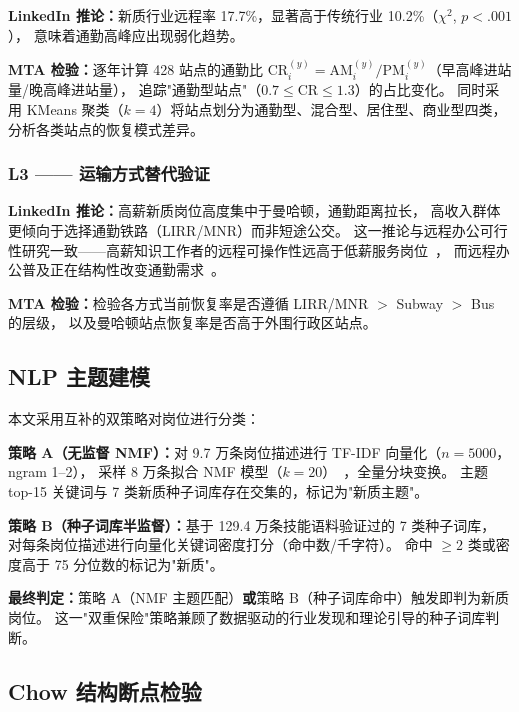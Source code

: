 \documentclass[runningheads]{llncs}
\begin{document}
\textbf{LinkedIn 推论：}新质行业远程率 17.7\%，显著高于传统行业 10.2\%（$\chi^2$, $p<.001$），
意味着通勤高峰应出现弱化趋势。

\textbf{MTA 检验：}逐年计算 428 站点的通勤比
$\text{CR}_i^{(y)} = \text{AM}_i^{(y)} / \text{PM}_i^{(y)}$（早高峰进站量/晚高峰进站量），
追踪"通勤型站点"（$0.7 \leq \text{CR} \leq 1.3$）的占比变化。
同时采用 KMeans 聚类（$k=4$）将站点划分为通勤型、混合型、居住型、商业型四类，
分析各类站点的恢复模式差异。

\subsubsection*{L3 —— 运输方式替代验证}

\textbf{LinkedIn 推论：}高薪新质岗位高度集中于曼哈顿，通勤距离拉长，
高收入群体更倾向于选择通勤铁路（LIRR/MNR）而非短途公交。
这一推论与远程办公可行性研究一致——高薪知识工作者的远程可操作性远高于低薪服务岗位~\cite{dingel2020}，
而远程办公普及正在结构性改变通勤需求~\cite{salon2022}。

\textbf{MTA 检验：}检验各方式当前恢复率是否遵循 LIRR/MNR $>$ Subway $>$ Bus 的层级，
以及曼哈顿站点恢复率是否高于外围行政区站点。

\subsection{NLP 主题建模}

本文采用互补的双策略对岗位进行分类：

\textbf{策略 A（无监督 NMF）：}对 9.7 万条岗位描述进行 TF-IDF 向量化（$n=5000$，ngram 1--2），
采样 8 万条拟合 NMF 模型（$k=20$）~\cite{lee1999}，全量分块变换。
主题 top-15 关键词与 7 类新质种子词库存在交集的，标记为"新质主题"。

\textbf{策略 B（种子词库半监督）：}基于 129.4 万条技能语料验证过的 7 类种子词库，
对每条岗位描述进行向量化关键词密度打分（命中数/千字符）。
命中 $\geq 2$ 类或密度高于 75 分位数的标记为"新质"。

\textbf{最终判定：}策略 A（NMF 主题匹配）\textbf{或}策略 B（种子词库命中）触发即判为新质岗位。
这一"双重保险"策略兼顾了数据驱动的行业发现和理论引导的种子词库判断。

\subsection{Chow 结构断点检验}
\end{document}
